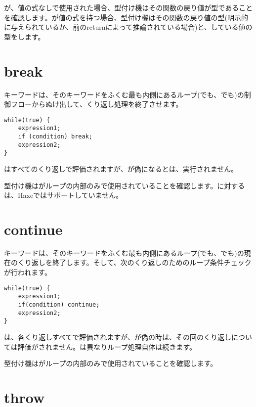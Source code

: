 が、値の式なしで使用された場合、型付け機はその関数の戻り値が型であることを確認します。が値の式を持つ場合、型付け機はその関数の戻り値の型(明示的に与えられているか、前のreturnによって推論されている場合)と、している値の型をします。

\section{break}
\label{expression-break}

キーワードは、そのキーワードをふくむ最も内側にあるループ(でも、でも)の制御フローからぬけ出して、くり返し処理を終了させます。

\begin{lstlisting}
while(true) {
	expression1;
	if (condition) break;
	expression2;
}
\end{lstlisting}

はすべてのくり返しで評価されますが、が偽になるとは、実行されません。

型付け機はがループの内部のみで使用されていることを確認します。に対するは、Haxeではサポートしていません。

\section{continue}
\label{expression-continue}

キーワードは、そのキーワードをふくむ最も内側にあるループ(でも、でも)の現在のくり返しを終了します。そして、次のくり返しのためのループ条件チェックが行われます。

\begin{lstlisting}
while(true) {
	expression1;
	if(condition) continue;
	expression2;
}
\end{lstlisting}

は、各くり返しすべてで評価されますが、が偽の時は、その回のくり返しについては評価がされません。は異なりループ処理自体は続きます。

型付け機はがループの内部のみで使用されていることを確認します。

\section{throw}
\label{expression-throw}

